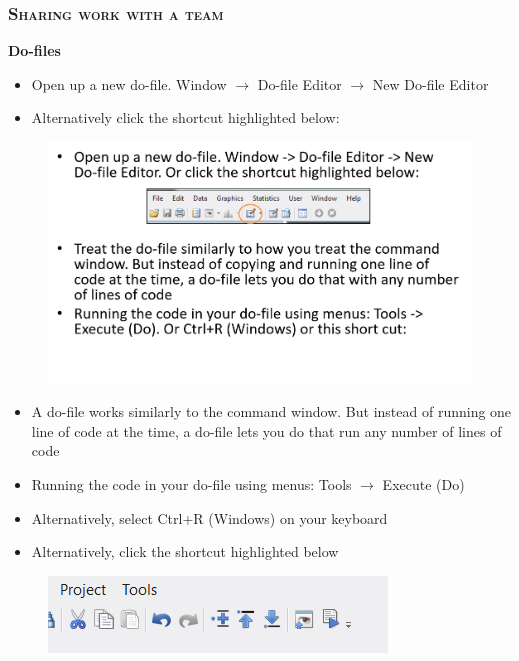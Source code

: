 \documentclass[10pt]{beamer}
\begin{document}
	\begin{frame}
		\frametitle{\textsc{Sharing work with a team}}
		\begin{center}
			\textbf{Do-files}
		\end{center}
		\begin{itemize}
			\item Open up a new do-file. Window $\rightarrow$ Do-file Editor $\rightarrow$ New Do-file Editor
			\item Alternatively click the shortcut highlighted below:
		\end{itemize}
		\begin{figure}[H] 
			\centering
			\includegraphics[width=0.9\linewidth]{dofile}
		\end{figure}
		\begin{itemize}
			\item A do-file works similarly to the command window. But instead of running one line of code at the time, a do-file lets you do that run any number of lines of code

			\item Running the code in your do-file using menus: Tools $\rightarrow$ Execute (Do) 
			\item Alternatively, select Ctrl+R (Windows) on your keyboard
			\item Alternatively, click the shortcut highlighted below

		\end{itemize}
		\begin{figure}[H] 
			\centering
			\includegraphics[width=0.9\linewidth]{run}
		\end{figure}		

	\end{frame}
		
\end{document}

